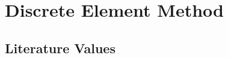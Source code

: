 
\chapter{Discrete Element Method}
\label{cap:dem}

\lipsum[1]

\section{Literature Values}
\label{sec:literaturevalues}

\lipsum[1]

